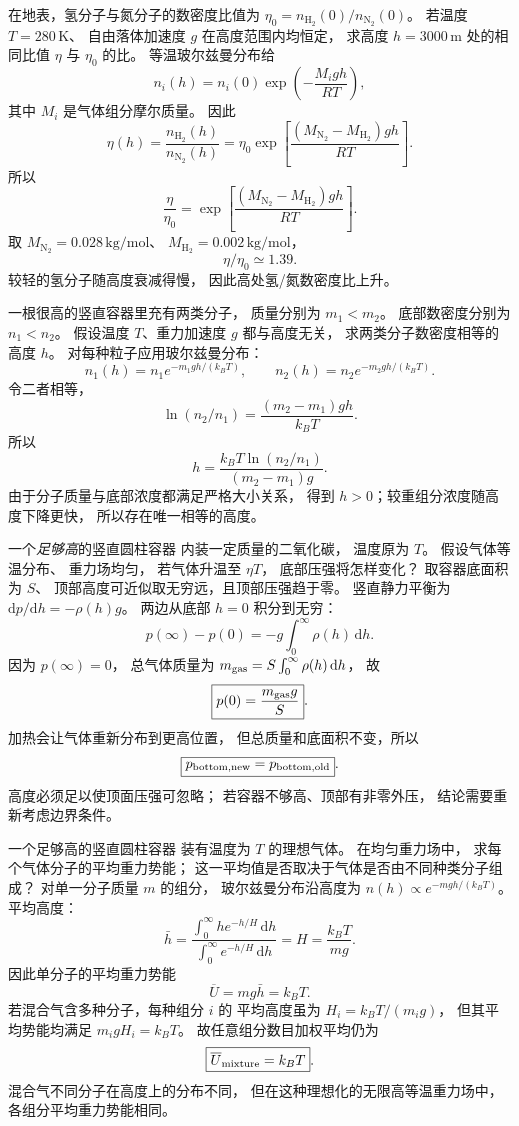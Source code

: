 在地表，氢分子与氮分子的数密度比值为
$\eta_0=n_{\mathrm H_2}(0)/n_{\mathrm N_2}(0)$。
若温度 $T=280\,\mathrm K$、
自由落体加速度 $g$ 在高度范围内均恒定，
求高度 $h=3000\,\mathrm m$ 处的相同比值
$\eta$ 与 $\eta_0$ 的比。
\exsolution
等温玻尔兹曼分布给
\[
n_i(h)=n_i(0)
\exp\left(-\frac{M_i gh}{RT}\right),
\]
其中 $M_i$ 是气体组分摩尔质量。
因此
\[
\eta(h)=\frac{n_{\mathrm H_2}(h)}
{n_{\mathrm N_2}(h)}
=\eta_0\exp\left[
\frac{(M_{\mathrm N_2}-M_{\mathrm H_2})gh}{RT}
\right].
\]
所以
\[
\boxed{\frac{\eta}{\eta_0}=
\exp\left[
\frac{(M_{\mathrm N_2}-M_{\mathrm H_2})gh}{RT}
\right]}.
\]
取 $M_{\mathrm N_2}=0.028\,\mathrm{kg/mol}$、
$M_{\mathrm H_2}=0.002\,\mathrm{kg/mol}$，
\[
\boxed{\eta/\eta_0\simeq1.39}.
\]
\excheck 较轻的氢分子随高度衰减得慢，
因此高处氢/氮数密度比上升。

一根很高的竖直容器里充有两类分子，
质量分别为 $m_1<m_2$。
底部数密度分别为 $n_1<n_2$。
假设温度 $T$、重力加速度 $g$ 都与高度无关，
求两类分子数密度相等的高度 $h$。
\exsolution
对每种粒子应用玻尔兹曼分布：
\[
n_1(h)=n_1e^{-m_1gh/(k_BT)},\qquad
n_2(h)=n_2e^{-m_2gh/(k_BT)}.
\]
令二者相等，
\[
\ln(n_2/n_1)=
\frac{(m_2-m_1)gh}{k_BT}.
\]
所以
\[
\boxed{h=\frac{k_BT\ln(n_2/n_1)}
{(m_2-m_1)g}}.
\]
\excheck 由于分子质量与底部浓度都满足严格大小关系，
得到 $h>0$；较重组分浓度随高度下降更快，
所以存在唯一相等的高度。

一个\emph{足够高}的竖直圆柱容器
内装一定质量的二氧化碳，
温度原为 $T$。
假设气体等温分布、
重力场均匀，
若气体升温至 $\eta T$，
底部压强将怎样变化？
\exsolution
取容器底面积为 $S$、
顶部高度可近似取无穷远，且顶部压强趋于零。
竖直静力平衡为
$\mathrm dp/\mathrm dh=-\rho(h)g$。
两边从底部 $h=0$ 积分到无穷：
\[
p(\infty)-p(0)
=-g\int_0^\infty\rho(h)\,\mathrm dh.
\]
因为 $p(\infty)=0$，
总气体质量为
$m_{\rm gas}=S\int_0^\infty\rho(h)\,\mathrm dh$，
故
\[
\boxed{p(0)=\frac{m_{\rm gas}g}{S}}.
\]
加热会让气体重新分布到更高位置，
但总质量和底面积不变，所以
\[
\boxed{p_{\rm bottom,new}=p_{\rm bottom,old}}.
\]
\excheck 高度必须足以使顶面压强可忽略；
若容器不够高、顶部有非零外压，
结论需要重新考虑边界条件。

一个足够高的竖直圆柱容器
装有温度为 $T$ 的理想气体。
在均匀重力场中，
求每个气体分子的平均重力势能；
这一平均值是否取决于气体是否由不同种类分子组成？
\exsolution
对单一分子质量 $m$ 的组分，
玻尔兹曼分布沿高度为
$n(h)\propto e^{-mgh/(k_BT)}$。
平均高度：
\[
\bar h=\frac{\int_0^\infty h e^{-h/H}\,\mathrm dh}
{\int_0^\infty e^{-h/H}\,\mathrm dh}
=H=\frac{k_BT}{mg}.
\]
因此单分子的平均重力势能
\[
\boxed{\overline U=mg\bar h=k_BT}.
\]
若混合气含多种分子，每种组分 $i$ 的
平均高度虽为
$H_i=k_BT/(m_i g)$，
但其平均势能均满足
$m_i gH_i=k_BT$。
故任意组分数目加权平均仍为
\[
\boxed{\overline U_{\rm mixture}=k_BT}.
\]
\excheck 混合气不同分子在高度上的分布不同，
但在这种理想化的无限高等温重力场中，
各组分平均重力势能相同。

